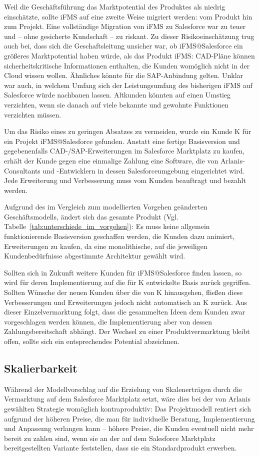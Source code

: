Weil die Geschäftsführung das Marktpotential des Produktes als niedrig einschätzte, sollte
iFMS auf eine zweite Weise migriert werden: vom Produkt 
hin zum Projekt. Eine vollständige Migration von iFMS zu Salesforce war zu 
teuer und -- ohne gesicherte Kundschaft -- zu riskant. Zu dieser 
Risikoeinschätzung trug auch bei, dass sich die Geschaftsleitung unsicher war, 
ob iFMS@Salesforce ein größeres Marktpotential haben würde, als das Produkt iFMS: 
CAD-Pläne können sicherheitskritische 
Informationen enthalten, die Kunden womöglich nicht in der Cloud wissen wollen. 
Ähnliches könnte für die SAP-Anbindung gelten. Unklar war auch, in 
welchem Umfang sich der Leistungsumfang des bisherigen iFMS auf Salesforce 
würde nachbauen lassen. Altkunden könnten auf einen Umstieg verzichten, wenn 
sie danach auf viele bekannte und gewohnte Funktionen verzichten müssen. 

Um das Risiko eines zu geringen Absatzes zu vermeiden, wurde ein Kunde K für 
ein Projekt iFMS@Salesforce gefunden. Anstatt eine fertige Basisversion und 
gegebenenfalls CAD-/SAP-Erweiterungen im Salesforce Marktplatz zu kaufen, 
erhält der Kunde gegen eine einmalige Zahlung eine Software, die von 
Arlanis-Consultants und -Entwicklern in dessen Salesforceumgebung eingerichtet 
wird. 
Jede Erweiterung und Verbesserung muss vom Kunden beauftragt und bezahlt werden.

Aufgrund des im Vergleich zum modellierten Vorgehen geänderten 
Geschäftsmodells, ändert sich das gesamte Produkt (Vgl. 
Tabelle~\ref{tab:unterschiede_im_vorgehen}): Es muss keine allgemein 
funktionierende Basisversion geschaffen werden, die Kunden dazu animiert, 
Erweiterungen zu kaufen, da eine monolithische, auf die jeweiligen 
Kundenbedürfnisse abgestimmte Architektur gewählt wird.

Sollten sich in Zukunft weitere Kunden für iFMS@Salesforce finden lassen, so 
wird für deren Implementierung auf die für K entwickelte Basis zurück 
gegriffen. Sollten Wünsche der neuen Kunden über die von K hinausgehen, fließen 
diese Verbesserungen und Erweiterungen jedoch nicht automatisch an K zurück. 
Aus dieser Einzelvermarktung folgt, dass die gesammelten Ideen dem Kunden zwar 
vorgeschlagen werden können, die Implementierung aber von dessen 
Zahlungsbereitschaft abhängt. Der Wechsel zu einer Produktvermarktung bleibt offen, sollte
sich ein entsprechendes Potential abzeichnen.

\subsection{Skalierbarkeit}
Während der Modellvorschlag auf die Erzielung von Skalenerträgen durch die 
Vermarktung auf dem Salesforce Marktplatz setzt, wäre dies bei der von Arlanis 
gewählten Strategie womöglich kontraproduktiv: Das Projektmodell rentiert sich 
aufgrund der höheren Preise, die man für individuelle Beratung, Implementierung 
und Anpassung verlangen kann -- höhere Preise, die Kunden eventuell nicht mehr 
bereit zu zahlen sind, wenn sie an der auf dem Salesforce Marktplatz 
bereitgestellten Variante feststellen, dass sie ein Standardprodukt erwerben.

